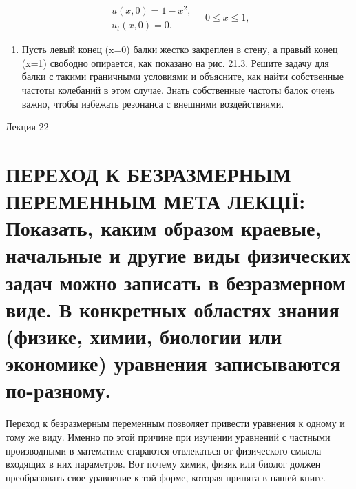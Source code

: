 \documentclass[
  ukrainian,
]{article}
\providecommand{\tightlist}{%
  \setlength{\itemsep}{0pt}\setlength{\parskip}{0pt}}
\begin{document}
\[
\begin{array}{l} u(x, 0) = 1 - x^2, \\ u_t(x, 0) = 0. \end{array}
\quad 0 \le x \le 1,
\]

\begin{enumerate}
\def\labelenumi{\arabic{enumi}.}
\setcounter{enumi}{3}
\tightlist
\item
  Пусть левый конец (x=0) балки жестко закреплен в стену, а правый конец
  (x=1) свободно опирается, как показано на рис. 21.3. Решите задачу для
  балки с такими граничными условиями и объясните, как найти собственные
  частоты колебаний в этом случае. Знать собственные частоты балок очень
  важно, чтобы избежать резонанса с внешними воздействиями.
\end{enumerate}

Лекция 22

\section{ПЕРЕХОД К БЕЗРАЗМЕРНЫМ ПЕРЕМЕННЫМ МЕТА ЛЕКЦІЇ: Показать, каким
образом краевые, начальные и другие виды физических задач можно записать
в безразмерном виде. В конкретных областях знания (физике, химии,
биологии или экономике) уравнения записываются
по-разному.}\label{ux43fux435ux440ux435ux445ux43eux434-ux43a-ux431ux435ux437ux440ux430ux437ux43cux435ux440ux43dux44bux43c-ux43fux435ux440ux435ux43cux435ux43dux43dux44bux43c-ux43cux435ux442ux430-ux43bux435ux43aux446ux456ux457-ux43fux43eux43aux430ux437ux430ux442ux44c-ux43aux430ux43aux438ux43c-ux43eux431ux440ux430ux437ux43eux43c-ux43aux440ux430ux435ux432ux44bux435-ux43dux430ux447ux430ux43bux44cux43dux44bux435-ux438-ux434ux440ux443ux433ux438ux435-ux432ux438ux434ux44b-ux444ux438ux437ux438ux447ux435ux441ux43aux438ux445-ux437ux430ux434ux430ux447-ux43cux43eux436ux43dux43e-ux437ux430ux43fux438ux441ux430ux442ux44c-ux432-ux431ux435ux437ux440ux430ux437ux43cux435ux440ux43dux43eux43c-ux432ux438ux434ux435.-ux432-ux43aux43eux43dux43aux440ux435ux442ux43dux44bux445-ux43eux431ux43bux430ux441ux442ux44fux445-ux437ux43dux430ux43dux438ux44f-ux444ux438ux437ux438ux43aux435-ux445ux438ux43cux438ux438-ux431ux438ux43eux43bux43eux433ux438ux438-ux438ux43bux438-ux44dux43aux43eux43dux43eux43cux438ux43aux435-ux443ux440ux430ux432ux43dux435ux43dux438ux44f-ux437ux430ux43fux438ux441ux44bux432ux430ux44eux442ux441ux44f-ux43fux43e-ux440ux430ux437ux43dux43eux43cux443.}

Переход к безразмерным переменным позволяет привести уравнения к одному
и тому же виду. Именно по этой причине при изучении уравнений с частными
производными в математике стараются отвлекаться от физического смысла
входящих в них параметров. Вот почему химик, физик или биолог должен
преобразовать свое уравнение к той форме, которая принята в нашей книге.
\end{document}
